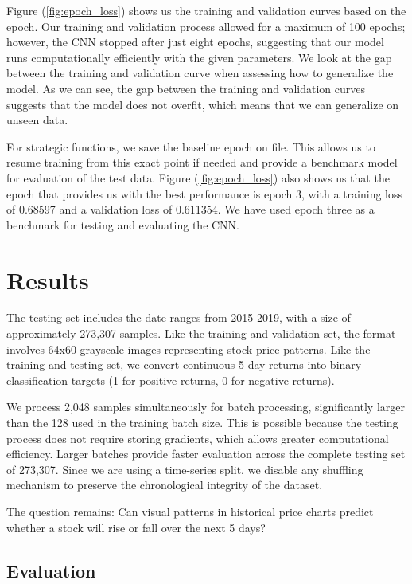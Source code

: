 \documentclass[12pt]{article}
\begin{document}
Figure (\ref{fig:epoch_loss}) shows us the training and validation curves based on the epoch. Our training and validation process allowed for a maximum of 100 epochs; however, the CNN stopped after just eight epochs, suggesting that our model runs computationally efficiently with the given parameters. We look at the gap between the training and validation curve when assessing how to generalize the model. As we can see, the gap between the training and validation curves suggests that the model does not overfit, which means that we can generalize on unseen data.

For strategic functions, we save the baseline epoch on file. This allows us to resume training from this exact point if needed and provide a benchmark model for evaluation of the test data. Figure (\ref{fig:epoch_loss}) also shows us that the epoch that provides us with the best performance is epoch 3, with a training loss of 0.68597 and a validation loss of 0.611354. We have used epoch three as a benchmark for testing and evaluating the CNN.

\section*{Results}


The testing set includes the date ranges from 2015-2019, with a size of approximately 273,307 samples. Like the training and validation set, the format involves 64x60 grayscale images representing stock price patterns. Like the training and testing set, we convert continuous 5-day returns into binary classification targets (1 for positive returns, 0 for negative returns). 

We process 2,048 samples simultaneously for batch processing, significantly larger than the 128 used in the training batch size. This is possible because the testing process does not require storing gradients, which allows greater computational efficiency. Larger batches provide faster evaluation across the complete testing set of 273,307. Since we are using a time-series split, we disable any shuffling mechanism to preserve the chronological integrity of the dataset.

The question remains: Can visual patterns in historical price charts predict whether a stock will rise or fall over the next 5 days?

\subsection*{Evaluation}
\end{document}
